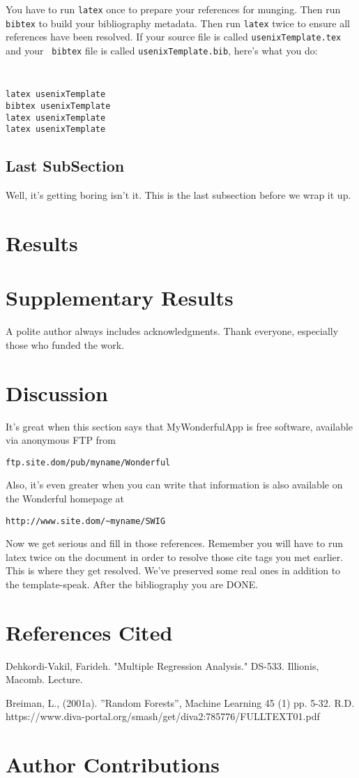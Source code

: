 \documentclass[letterpaper,twocolumn,10pt]{article}
\begin{document}
You have to run {\tt latex} once to prepare your references for
munging.  Then run {\tt bibtex} to build your bibliography metadata.
Then run {\tt latex} twice to ensure all references have been resolved.
If your source file is called {\tt usenixTemplate.tex} and your {\tt
  bibtex} file is called {\tt usenixTemplate.bib}, here's what you do:
{\tt \small
\begin{verbatim}
latex usenixTemplate
bibtex usenixTemplate
latex usenixTemplate
latex usenixTemplate
\end{verbatim}
}


\subsection{Last SubSection}

Well, it's getting boring isn't it.  This is the last subsection
before we wrap it up.


\section{Results}

\section{Supplementary Results}

A polite author always includes acknowledgments.  Thank everyone,
especially those who funded the work. 

\section{Discussion}

It's great when this section says that MyWonderfulApp is free software, 
available via anonymous FTP from

\begin{center}
{\tt ftp.site.dom/pub/myname/Wonderful}\\
\end{center}

Also, it's even greater when you can write that information is also 
available on the Wonderful homepage at 

\begin{center}
{\tt http://www.site.dom/\~{}myname/SWIG}
\end{center}

Now we get serious and fill in those references.  Remember you will
have to run latex twice on the document in order to resolve those
cite tags you met earlier.  This is where they get resolved.
We've preserved some real ones in addition to the template-speak.
After the bibliography you are DONE.

\section{References Cited}

Dehkordi-Vakil, Farideh. "Multiple Regression Analysis." DS-533. Illionis, Macomb. Lecture.

Breiman, L., (2001a). ”Random Forests”, Machine Learning 45 (1) pp. 5-32.
R.D. https://www.diva-portal.org/smash/get/diva2:785776/FULLTEXT01.pdf


\section{Author Contributions}
\end{document}
